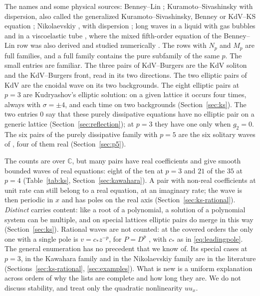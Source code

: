 \documentclass[11pt]{article}
\theoremstyle{definition}
\theoremstyle{remark}
\newcommand{\CC}{\mathbb C}
\numberwithin{equation}{section}
\begin{document}
The names and some physical sources: Benney--Lin
\citep{Benney1966,Lin1974}; Kuramoto--Sivashinsky with dispersion, also
called the generalized Kuramoto--Sivashinsky, Benney or KdV--KS equation
\citep{KawaharaToh1988}; Nikolaevskiy \citep{Nikolaevskii1989}, with
dispersion \citep{KudryashovMigita2007,SimbawaMatthewsCox2010}; long
waves in a liquid with gas bubbles
\citep{KudryashovSinelshchikov2010,KudryashovSinelshchikovFourthOrder2010}
and in a viscoelastic tube
\citep{KudryashovChernyavskii2006,KudryashovSinelshchikovChernyavsky2008},
where the mixed fifth-order equation of the Benney--Lin row was also
derived \citep{KudryashovSinelshchikov2011} and studied numerically
\citep{KudryashovRyabovSinelshchikov2011}. The rows with \(N_p\) and
\(M_p\) are full families, and a full family contains the pure subfamily
of the same \(p\). The small entries are familiar. The three pairs of
KdV--Burgers are the KdV soliton and the KdV--Burgers front, read in its
two directions. The two elliptic pairs of KdV are the cnoidal wave on
its two backgrounds. The eight elliptic pairs at \(p=3\) are
Kudryashov's elliptic solution: on a given lattice it occurs four times,
always with \(\sigma=\pm4\), and each time on two backgrounds
(Section~\ref{sec:ks}). The two entries \(0\) say that these purely
dissipative equations have no elliptic pair on a generic lattice
(Section~\ref{sec:reflection}); at \(p=3\) they have one only when
\(g_2=0\). The six pairs of the purely dissipative family with \(p=5\)
are the six solitary waves of \citet{KudryashovDemina2007}, four of them
real \citep{KudryashovMigita2007} (Section~\ref{sec:p5}).

The counts are over \(\CC\), but many pairs have real coefficients and
give smooth bounded waves of real equations: eight of the ten at \(p=3\)
and \(21\) of the \(35\) at \(p=4\) (Table~\ref{tab:ks},
Section~\ref{sec:kawahara}). A pair with non-real coefficients at unit
rate can still belong to a real equation, at an imaginary rate; the wave
is then periodic in \(x\) and has poles on the real axis
(Section~\ref{sec:ks-rational}). \emph{Distinct} carries content: like a
root of a polynomial, a solution of a polynomial system can be multiple,
and on special lattices elliptic pairs do merge in this way
(Section~\ref{sec:ks}). Rational waves are not counted: at the covered
orders the only one with a single pole is \(v=c_\ast z^{-p}\), for
\(P=D^p\) \citep{Kudryashov2004}, with \(c_\ast\) as in
\eqref{eq:leadingpole}. The general enumeration has no precedent that we
know of. Its special cases at \(p=3\), in the Kawahara family
\citep{Kudryashov1989,DeminaKudryashovKawahara2010} and in the
Nikolaevskiy family \citep{KudryashovDemina2007} are in the literature
(Sections~\ref{sec:ks-rational}, \ref{sec:examples}). What is new is a
uniform explanation across orders of why the lists are complete and
how long they are. We do not discuss stability, and treat only the
quadratic nonlinearity \(uu_x\).
\end{document}
